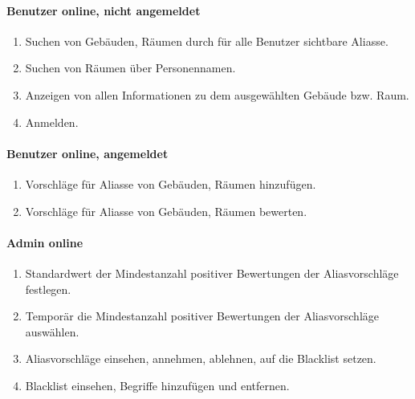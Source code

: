 \paragraph{Benutzer online, nicht angemeldet}
\begin{enumerate}[label=\textbf{/T\arabic*0/}, align=left]
	\item Suchen von Gebäuden, Räumen durch für alle Benutzer sichtbare Aliasse.
	\item Suchen von Räumen über Personennamen.
	\item Anzeigen von allen Informationen zu dem ausgewählten Gebäude bzw. Raum.
	\item Anmelden.
\end{enumerate}

\paragraph{Benutzer online, angemeldet}
\begin{enumerate}[label=\textbf{/T\arabic*0/}, align=left]
	\item Vorschläge für Aliasse von Gebäuden, Räumen hinzufügen.
	\item Vorschläge für Aliasse von Gebäuden, Räumen bewerten.
\end{enumerate}

\paragraph{Admin online}
\begin{enumerate}[label=\textbf{/T\arabic*0/}, align=left]
	\item Standardwert der Mindestanzahl positiver Bewertungen der Aliasvorschläge festlegen.
	\item Temporär die Mindestanzahl positiver Bewertungen der Aliasvorschläge auswählen.
	\item Aliasvorschläge einsehen, annehmen, ablehnen, auf die Blacklist setzen.
	\item Blacklist einsehen, Begriffe hinzufügen und entfernen.
\end{enumerate}
